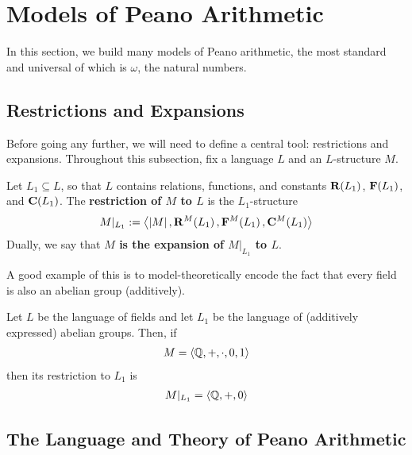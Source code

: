 \section{Models of Peano Arithmetic}

In this section, we build many models of Peano arithmetic, the most standard and universal of which is $\omega$, the natural numbers.

\subsection{Restrictions and Expansions}

Before going any further, we will need to define a central tool: restrictions and expansions. Throughout this subsection, fix a language $L$ and an $L$-structure $M$.

\begin{boxdefinition}
    Let $L_1 \subseteq L$, so that $L$ contains relations, functions, and constants $\mathbf{R}\!\left( L_1 \right)$, $\mathbf{F}\!\left( L_1 \right)$, and $\mathbf{C}\!\left( L_1 \right)$. The \textbf{restriction of $M$ to $L$} is the $L_1$-structure
    \begin{align*}
        M \vert_{L_1} := \left\langle \left\lvert M \right\rvert, \mathbf{R}^{M}\!\left( L_1 \right), \mathbf{F}^M\!\left( L_1 \right), \mathbf{C}^M\!\left( L_1 \right) \right\rangle
    \end{align*}
    Dually, we say that \textbf{$M$ is the expansion of $M\vert_{L_1}$ to $L$}.
\end{boxdefinition}

A good example of this is to model-theoretically encode the fact that every field is also an abelian group (additively).

\begin{boxexample}
    Let $L$ be the language of fields and let $L_1$ be the language of (additively expressed) abelian groups. Then, if
    \begin{align*}
        M = \left\langle \mathbb{Q}, +, \cdot, 0, 1 \right\rangle
    \end{align*}
    then its restriction to $L_1$ is
    \begin{align*}
        M\vert_{L_1} = \left\langle \mathbb{Q}, +, 0 \right\rangle
    \end{align*}
\end{boxexample}

\subsection{The Language and Theory of Peano Arithmetic}

